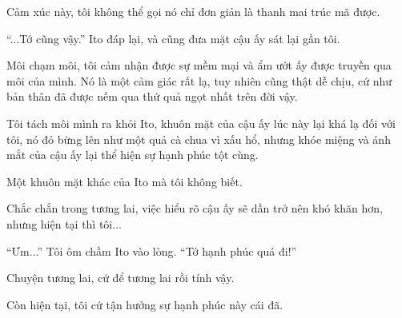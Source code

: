 {Cảm xúc này, tôi không thể gọi nó chỉ đơn giản là thanh mai trúc mã
được.

``...Tớ cũng vậy.'' Ito đáp lại, và cũng đưa mặt cậu ấy sát lại gần tôi.

Môi chạm môi, tôi cảm nhận được sự mềm mại và ẩm ướt ấy được truyền qua
môi của mình. Nó là một cảm giác rất lạ, tuy nhiên cũng thật dễ chịu, cứ
như bản thân đã được nếm qua thứ quả ngọt nhất trên đời vậy.

Tôi tách môi mình ra khỏi Ito, khuôn mặt của cậu ấy lúc này lại khá lạ
đối với tôi, nó đỏ bừng lên như một quả cà chua vì xấu hổ, nhưng khóe
miệng và ánh mắt của cậu ấy lại thể hiện sự hạnh phúc tột cùng.

Một khuôn mặt khác của Ito mà tôi không biết.

Chắc chắn trong tương lai, việc hiểu rõ cậu ấy sẽ dần trở nên khó khăn
hơn, nhưng hiện tại thì tôi...

``Ưm...'' Tôi ôm chầm Ito vào lòng. ``Tớ hạnh phúc quá đi!''

Chuyện tương lai, cứ để tương lai rồi tính vậy.

Còn hiện tại, tôi cứ tận hưởng sự hạnh phúc này cái đã.

}